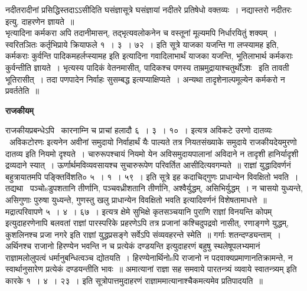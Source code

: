 \documentclass[11pt, openany]{book}
\begin{document}
नदीतरादीनां प्रसिद्धिस्तदाऽऽसीदिति घसंज्ञासूत्रे {\qt घसंज्ञायां नदीतरे प्रतिषेधो वक्तव्यः~। नद्यास्तरो नदीतरः} इत्यु. दाहरणेन ज्ञायते~॥\\

भृत्यादिना कर्मकरा अपि तदानीमासन्, तद्भृत्यवलोकनेन च वस्तूनां मूल्यमपि निर्धारयितुं शक्यम्~। स्वरितञितः कर्तृभिप्राये क्रियाफले १~। ३~। ७२~। इति सूत्रे याजका यजन्ति गा लप्स्यामह इति, कर्मकराः कुर्वन्ति पादिकमहर्लप्स्यामह इति इत्यादिना गवादिलाभार्थं याजका यजन्ति, भूतिलाभार्थ कर्मकराः कुर्वन्तीति ज्ञायते~। भृत्यस्य पादिकं वेतनमासीत्, पादिकश्च पणस्य ताम्रमुद्रायाश्चतुर्थोंऽशः \textendash\ इति तावती भूतिरासीत्~। तदा पणपादेन निर्वाहः सुसम्बद्ध इत्यप्याक्षिप्यते~। अन्यथा तादृशेनाल्पमूल्येन कर्मकरो न प्रवर्ततेति~॥

\begin{center}
\textbf{\Large राजकीयम् \textendash\ }
\end{center}

राजकीयप्रबन्धेऽपि \textendash\ कारनाम्नि च प्राचां हलादौ ६~। ३~। १०~। इत्यत्र अविकटे उरणो दातव्यः \textendash\ अविकटोरणः इत्यनेन अवीनां समुदायो निर्वाहार्थं यैः पाल्यते तत्र नियतसंख्याके समुदाये राजकीयदेयमुरणो दातव्य इति नियमो दृश्यते~। चारुरूपश्चायं नियमो येन अविसमुदायपालानां अविदाने न तादृशी हानिर्यादृशी द्रव्यदाने स्यात्~। ऊर्णार्थमविव्यवसायश्च सुचारुरूपेण परिवर्तित आसीदित्यवगम्यते~॥ राज्ञां युद्धादिवर्णनं बहुत्रायातमपि पङ्क्तिविंशति० ५~। १~। ५९~। इति सूत्रे इह कदाचिद्गुणः प्राधान्येन विवक्षितो भवति~। तद्यथा \textendash\ पञ्चोsडुपशतानि तीर्णानि, पञ्चवध्रीशतानि तीर्णानि, अश्वैर्युद्धम्, असिभिर्युद्धम्~। न चासयो युध्यन्ते, असिगुणाः पुरुषा युध्यन्ते, गुणस्तु खलु प्राधान्येन विवक्षितो भवति इत्यादिवर्णनं विशेषतामाधत्ते~॥ मद्रात्परिवापणे ५~। ४~। ६७~। इत्यत्र {\qt क्षेमे सुभिक्षे कृतसञ्चयानि पुराणि राज्ञां विनयन्ति कोपम्} इत्युदाहरणेनापि बलवतां राज्ञां पारस्परिके प्रहरणेऽपि तत्र प्रजानां कश्चिदुपद्रवो नासीत्, रणाङ्गणे युद्धम्, कुशलिनश्च प्रजा नगरे इति राज्ञां युद्धप्रसङ्गे सर्वेऽपि संव्यवहरन्ते स्मेति~॥ {\qt गर्गाः शतन्दण्ड्यन्ताम्~। अर्थिनश्च राजानो हिरण्येन भवन्ति न च प्रत्येकं दण्डयन्ति} इत्युदाहरणं बहुषु स्थलेषूपलभ्यमानं राज्ञामलोलुपत्वं धर्मानुबन्धित्वञ्च द्योतयति~। हिरण्येनार्थिनोsपि राजानो न पदवाक्यप्रमाणानतिक्रामन्ते, न स्वार्थानुसारेण प्रत्येकं दण्डयन्तीति भावः~॥ {\qt अमात्यानां राज्ञा सह समवाये पारतन्त्र्यं व्यवाये स्वातन्त्र्यम्} इति कारके १~। ४~। २३~। इति सूत्रोपात्तमुदाहरणं राज्ञाममात्यानाश्चैकमत्यमेव प्रतिपादयति~॥\\
\end{document}
